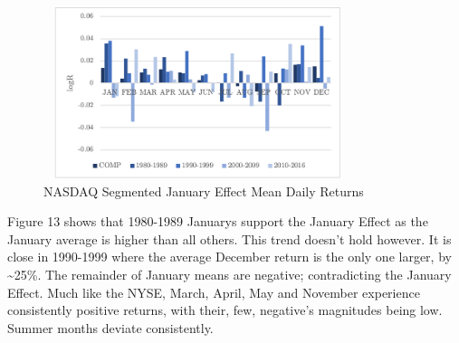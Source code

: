\documentclass[11pt, english]{article}
\begin{document}
	\begin{figure}[H]
        \begin{center}
                \includegraphics[width=9cm,height=5cm]{NAS-JE2.png}  
                \caption{NASDAQ Segmented January Effect Mean Daily Returns}
        \end{center}
        \end{figure}

	Figure 13 shows that 1980-1989 Januarys support the January Effect as the January average is higher than all others. This trend doesn’t hold however. It is close in 1990-1999 where the average December return is the only one larger, by \~{}25\%. The remainder of January means are negative; contradicting the January Effect. Much like the NYSE, March, April, May and November experience consistently positive returns, with their, few, negative’s magnitudes being low. Summer months deviate consistently.
\end{document}
